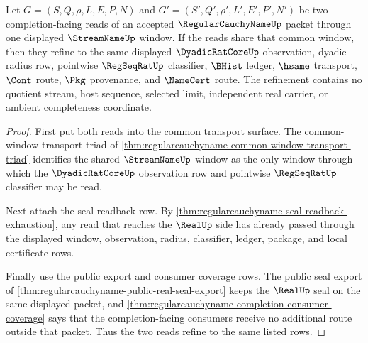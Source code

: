 \begin{theorem}
\label{thm:regularcauchyname-common-window-refinement}
Let $G=(S,Q,\rho,L,E,P,N)$ and $G'=(S',Q',\rho',L',E',P',N')$ be two completion-facing reads of an accepted $\RegularCauchyNameUp$ packet through one displayed $\StreamNameUp$ window. If the reads share that common window, then they refine to the same displayed $\DyadicRatCoreUp$ observation, dyadic-radius row, pointwise $\RegSeqRatUp$ classifier, $\BHist$ ledger, $\hsame$ transport, $\Cont$ route, $\Pkg$ provenance, and $\NameCert$ route. The refinement contains no quotient stream, host sequence, selected limit, independent real carrier, or ambient completeness coordinate.
\end{theorem}
\begin{proof}
First put both reads into the common transport surface. The common-window transport triad of \autoref{thm:regularcauchyname-common-window-transport-triad} identifies the shared $\StreamNameUp$ window as the only window through which the $\DyadicRatCoreUp$ observation row and pointwise $\RegSeqRatUp$ classifier may be read.

Next attach the seal-readback row. By \autoref{thm:regularcauchyname-seal-readback-exhaustion}, any read that reaches the $\RealUp$ side has already passed through the displayed window, observation, radius, classifier, ledger, package, and local certificate rows.

Finally use the public export and consumer coverage rows. The public seal export of \autoref{thm:regularcauchyname-public-real-seal-export} keeps the $\RealUp$ seal on the same displayed packet, and \autoref{thm:regularcauchyname-completion-consumer-coverage} says that the completion-facing consumers receive no additional route outside that packet. Thus the two reads refine to the same listed rows.
\end{proof}


